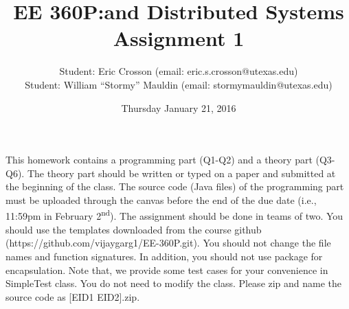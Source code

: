 \documentclass[11pt]{article}
\begin{document}
\title{EE 360P:\@Concurrent and Distributed Systems \\ Assignment 1}
\author{Student: Eric Crosson (email: eric.s.crosson@utexas.edu)\\
  Student: William ``Stormy'' Mauldin (email: stormymauldin@utexas.edu)}
\date{Thursday January 21, 2016}
\maketitle

This homework contains a programming part (Q1-Q2) and a theory part (Q3-Q6). The
theory part should be written or typed on a paper and submitted at the beginning
of the class. The source code (Java files) of the programming part must be
uploaded through the canvas before the end of the due date (i.e., 11:59pm in
February 2\textsuperscript{nd}). The assignment should be done in teams of two. You
should use the templates downloaded from the course github
(https://github.com/vijaygarg1/EE-360P.git). You should not change the file
names and function signatures. In addition, you should not use package for
encapsulation. Note that, we provide some test cases for your convenience in
SimpleTest class. You do not need to modify the class. Please zip and name the
source code as [EID1 EID2].zip. \\
\end{document}
